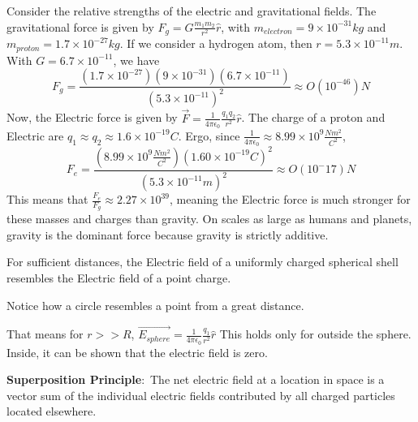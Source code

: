 \documentclass[nobib]{tufte-handout}
\newcommand{\defn}[2]{\noindent\textbf{#1}:\ #2}
\begin{document}
Consider the relative strengths of the electric and 
gravitational fields. The gravitational force is given by
$F_g = G\frac{m_1m_2}{r^2}\hat{r}$, with $m_{electron} = 9 \times 10^{-31} kg$
and $m_{proton} = 1.7 \times 10^{-27} kg$. If we consider a hydrogen atom,  
then $r = 5.3 \times 10^{-11} m$. With $G = 6.7 \times 10^{-11}$, we have 
\[F_g = \frac{(1.7 \times 10^{-27})(9 \times 10^{-31})(6.7 \times 10^{-11})}{(5.3 \times 10^{-11})^2} \approx O(10^{-46})N\]
Now, the Electric force is given by $\vec{F} = \frac{1}{4\pi \epsilon_0}\frac{q_1 q_2}{r^2}\hat{r}$. 
The charge of a proton and Electric are $q_1 \approx q_2 \approx 1.6 \times 10^{-19} C$.
Ergo, since $\frac{1}{4\pi \epsilon_0} \approx 8.99 \times 10^9 \frac{Nm^2}{C^2}$, 
\[F_e = \frac{(8.99 \times 10^9 \frac{Nm^2}{C^2})(1.60\times10^{-19}C)^2}{(5.3\times10^{-11}m)^2} \approx O(10^-17)N\]
This means that $\frac{F_e}{F_g}\approx 2.27 \times 10^{39}$, meaning the Electric force is
much stronger for these masses and charges than gravity. On scales as large as humans and planets,
gravity is the dominant force because gravity is strictly additive.

For sufficient distances, the Electric field
of a uniformly charged spherical shell resembles
the Electric field of a point charge. 

\begin{marginfigure}
    \begin{center}
    \end{center}

    \caption{Notice how a circle resembles a point from a great distance.}
    \label{fig:long-distance-point-sphere}
\end{marginfigure}

That means for $r>>R$, $\vec{E_{sphere}} = \frac{1}{4\pi \epsilon_0}\frac{q_1}{r^2}\hat{r}$
This holds only for outside the sphere. Inside, it can be shown that the electric field is zero. 

\defn{Superposition Principle}{The net electric field at a location in space is a
vector sum of the individual electric fields contributed by all
charged particles located elsewhere.}
\end{document}
